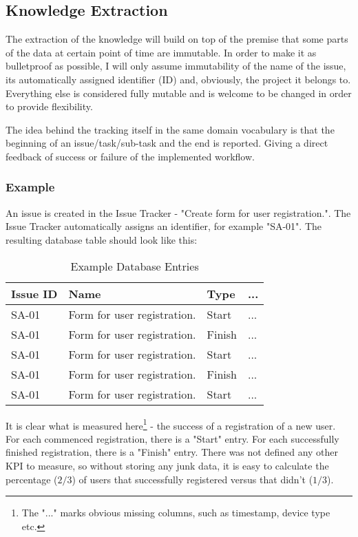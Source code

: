 \subsection{Knowledge Extraction}

The extraction of the knowledge will build on top of the premise that some parts of the data at certain point of time are immutable. In order to make it as bulletproof as possible, I will only assume immutability of the name of the issue, its automatically assigned identifier (ID) and, obviously, the project it belongs to. Everything else is considered fully mutable and is welcome to be changed in order to provide flexibility.

The idea behind the tracking itself in the same domain vocabulary is that the beginning of an issue/task/sub-task and the end is reported. Giving a direct feedback of success or failure of the implemented workflow.

\subsubsection*{Example}

An issue is created in the Issue Tracker - "Create form for user registration.". The Issue Tracker automatically assigns an identifier, for example "SA-01". The resulting database table should look like this:

\bigbreak

\begin{table}[!ht]
\begin{center}
\begin{tabular}{|l|l|l|l|}
\hline
\textbf{Issue ID} & \textbf{Name} & \textbf{Type} & \textbf{...} \\
\hline
SA-01 & Form for user registration. & Start & ... \\
\hline
SA-01 & Form for user registration. & Finish & ... \\
\hline
SA-01 & Form for user registration. & Start & ...\\
\hline
SA-01 & Form for user registration. & Finish & ... \\
\hline
SA-01 & Form for user registration. & Start & ...\\
\hline
\end{tabular}
\end{center}
\caption{Example Database Entries}
\label{tab:ex_db}
\end{table}

It is clear what is measured here\footnote{The "..." marks obvious missing columns, such as timestamp, device type etc.} - the success of a registration of a new user. For each commenced registration, there is a "Start" entry. For each successfully finished registration, there is a "Finish" entry. There was not defined any other KPI to measure, so without storing any junk data, it is easy to calculate the percentage ($2/3$) of users that successfully registered versus that didn't ($1/3$).

